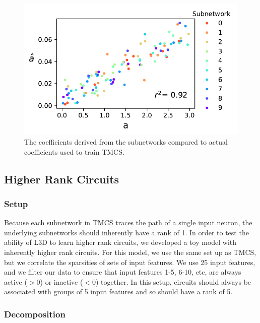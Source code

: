 \documentclass{article}
\theoremstyle{plain}
\theoremstyle{definition}
\theoremstyle{remark}
\begin{document}
\begin{figure}[htbp]
    \centerline{\includegraphics[width=\columnwidth]{../figures/6_circuit_superposition_coefficients.pdf}}
    \centering
    \caption{The coefficients derived from the subnetworks compared to actual coefficients used to train TMCS.}\label{fig:6_circuit_superposition_coefficients}
\end{figure}


\subsection{Higher Rank Circuits}

\subsubsection{Setup}
Because each subnetwork in TMCS traces the path of a single input neuron, the underlying subnetworks should inherently have a rank of 1. In order to test the ability of L3D to learn higher rank circuits, we developed a toy model with inherently higher rank circuits. For this model, we use the same set up as TMCS, but we correlate the sparsities of sets of input features. We use 25 input features, and we filter our data to ensure that input features 1-5, 6-10, etc, are always active ($>0$) or inactive ($<0$) together. In this setup, circuits should always be associated with groups of 5 input features and so should have a rank of 5.

\subsubsection{Decomposition}
\end{document}

